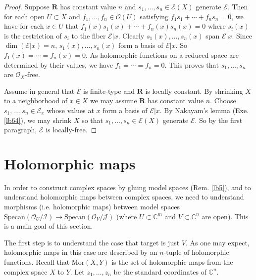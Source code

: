 \documentclass[12pt,b5paper,notitlepage]{report}
\theoremstyle{definition}
\theoremstyle{plain}
\newcommand{\mc}{\mathcal}
\newcommand{\scr}{\mathscr}
\newcommand{\Cbb}{\mathbb C}
\newcommand{\Rbf}{\mathbf R}
\newcommand{\Specan}{\mathrm{Specan}}
\newcommand{\Mor}{\mathrm{Mor}}
\numberwithin{equation}{section}
\begin{document}
\begin{proof}
Suppose $\Rbf$ has constant value $n$ and $s_1,\dots,s_n\in\scr E(X)$ generate $\scr E$. Then for each open $U\subset X$ and $f_1,\dots,f_n\in\scr O(U)$ satisfying $f_1s_1+\cdots+f_ns_n=0$, we have for each $x\in U$ that $f_1(x)s_1(x)+\cdots+f_n(x)s_n(x)=0$ where $s_i(x)$ is the restriction of $s_i$ to the fiber $\scr E|x$. Clearly $s_1(x),\dots,s_n(x)$ span $\scr E|x$. Since $\dim(\scr E|x)=n$, $s_1(x),\dots,s_n(x)$ form a basis of $\scr E|x$. So $f_1(x)=\cdots=f_n(x)=0$. As holomorphic functions on a reduced space are determined by their values, we have $f_1=\cdots=f_n=0$. This proves that $s_1,\dots,s_n$ are $\scr O_X$-free.

Assume in general that $\scr E$ is finite-type and $\Rbf$ is locally constant. By shrinking $X$ to a neighborhood of $x\in X$ we may assume $\Rbf$ has constant value $n$. Choose $s_1,\dots,s_n\in\scr E_x$ whose values at $x$ form a basis of $\scr E|x$. By Nakayam's lemma (Exe. \ref{lb64}), we may shrink $X$ so that $s_1,\dots,s_n\in\scr E(X)$ generate $\scr E$. So by the first paragraph, $\scr E$ is locally-free.
\end{proof}



















\section{Holomorphic maps}

In order to construct complex spaces by gluing model spaces (Rem. \ref{lb5}), and to understand holomorphic maps between complex spaces, we need to understand morphisms (i.e. holomorphic maps) between model spaces $\Specan(\scr O_U/\mc I)\rightarrow\Specan(\scr O_V/\mc J)$ (where $U\subset\Cbb^m$ and $V\subset \Cbb^n$ are open). This is a main goal of this section. 

The first step is to understand the case that target is just $V$. As one may expect, holomorphic maps in this case are described by an $n$-tuple of holomorphic functions. Recall that $\Mor(X,Y)$ is the set of holomorphic maps from the complex space $X$ to  $Y$. Let $z_1,\dots,z_n$ be the standard coordinates of $\Cbb^n$.
\end{document}

